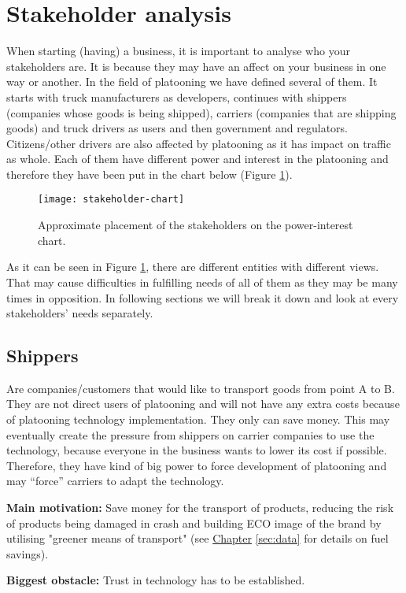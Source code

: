 \section{Stakeholder analysis}\label{sec:stakeholders}

\begin{center}
\end{center}
% 
% 
When starting (having) a business, it is important to analyse who your stakeholders are. It is because they may have an affect on your business in one way or another. In the field of platooning we have defined several of them. It starts with truck manufacturers as developers, continues with shippers (companies whose goods is being shipped), carriers (companies that are shipping goods) and truck drivers as users and then government and regulators. Citizens/other drivers are also affected by platooning as it has impact on traffic as whole. Each of them have different power and interest in the platooning and therefore they have been put in the chart below (Figure \ref{fig:stakeholder-chart}).\par
% 
\begin{figure}[h]
    \centering
    \texttt{[image: stakeholder-chart]}
    \caption{Approximate placement of the stakeholders on the power-interest chart.}
    \label{fig:stakeholder-chart}
\end{figure}
% 
As it can be seen in Figure \ref{fig:stakeholder-chart}, there are different entities with different views. That may cause difficulties in fulfilling needs of all of them as they may be many times in opposition. In following sections we will break it down and look at every stakeholders’ needs separately.\par
% 
\subsection{Shippers}
Are companies/customers that would like to transport goods from point A to B. They are not direct users of platooning and will not have any extra costs because of platooning technology implementation. They only can save money. This may eventually create the pressure from shippers on carrier companies to use the technology, because everyone in the business wants to lower its cost if possible. Therefore, they have kind of big power to force development of platooning and may “force” carriers to adapt the technology.
% 
% 
\par \textbf{Main motivation:} Save money for the transport of products, reducing the risk of products being damaged in crash and building ECO image of the brand by utilising "greener means of transport" (see \hyperref[sec:data]{Chapter} \ref{sec:data} for details on fuel savings).
%
\par \textbf{Biggest obstacle:} Trust in technology has to be established.
% 
% 
